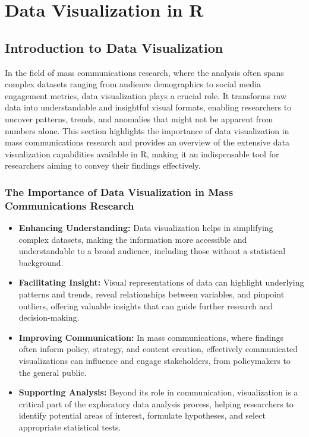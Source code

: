 \documentclass[
]{book}
\begin{document}
\hypertarget{data-visualization-in-r}{%
\chapter{Data Visualization in R}\label{data-visualization-in-r}}

\hypertarget{introduction-to-data-visualization}{%
\section{Introduction to Data Visualization}\label{introduction-to-data-visualization}}

In the field of mass communications research, where the analysis often spans complex datasets ranging from audience demographics to social media engagement metrics, data visualization plays a crucial role. It transforms raw data into understandable and insightful visual formats, enabling researchers to uncover patterns, trends, and anomalies that might not be apparent from numbers alone. This section highlights the importance of data visualization in mass communications research and provides an overview of the extensive data visualization capabilities available in R, making it an indispensable tool for researchers aiming to convey their findings effectively.

\hypertarget{the-importance-of-data-visualization-in-mass-communications-research}{%
\subsection{The Importance of Data Visualization in Mass Communications Research}\label{the-importance-of-data-visualization-in-mass-communications-research}}

\begin{itemize}
\item
  \textbf{Enhancing Understanding:} Data visualization helps in simplifying complex datasets, making the information more accessible and understandable to a broad audience, including those without a statistical background.
\item
  \textbf{Facilitating Insight:} Visual representations of data can highlight underlying patterns and trends, reveal relationships between variables, and pinpoint outliers, offering valuable insights that can guide further research and decision-making.
\item
  \textbf{Improving Communication:} In mass communications, where findings often inform policy, strategy, and content creation, effectively communicated visualizations can influence and engage stakeholders, from policymakers to the general public.
\item
  \textbf{Supporting Analysis:} Beyond its role in communication, visualization is a critical part of the exploratory data analysis process, helping researchers to identify potential areas of interest, formulate hypotheses, and select appropriate statistical tests.
\end{itemize}
\end{document}

